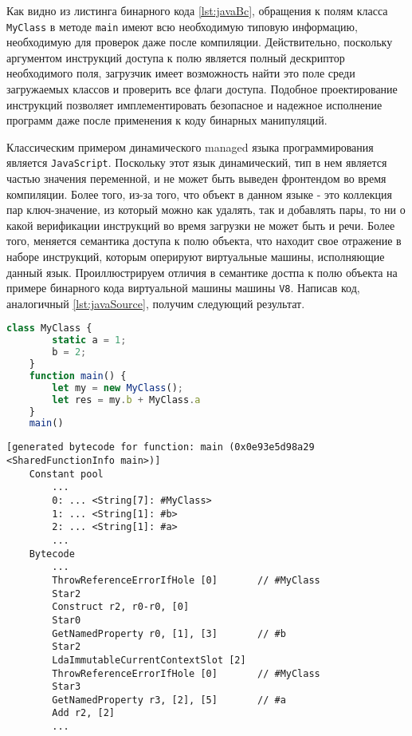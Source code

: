Как видно из листинга бинарного кода \autoref{lst:javaBc}, обращения к полям класса \texttt{MyClass} в методе \texttt{main} имеют всю необходимую типовую информацию, необходимую для проверок даже после компиляции. Действительно, поскольку аргументом инструкций доступа к полю является полный дескриптор необходимого поля, загрузчик имеет возможность найти это поле среди загружаемых классов и проверить все флаги доступа. Подобное проектирование инструкций позволяет имплементировать безопасное и надежное исполнение программ даже после применения к коду бинарных манипуляций.

Классическим примером динамического managed языка программирования является \texttt{JavaScript}. Поскольку этот язык динамический, тип в нем является частью значения переменной, и не может быть выведен фронтендом во время компиляции. Более того, из-за того, что объект в данном языке - это коллекция пар ключ-значение, из который можно как удалять, так и добавлять пары, то ни о какой верификации инструкций во время загрузки не может быть и речи. Более того, меняется семантика доступа к полю объекта, что находит свое отражение в наборе инструкций, которым оперируют виртуальные машины, исполняющие данный язык. Проиллюстрируем отличия в семантике достпа к полю объекта на примере бинарного кода виртуальной машины машины \texttt{V8}. Написав код, аналогичный \autoref{lst:javaSource}, получим следующий результат.

\begin{lstlisting}[language=Javascript, caption=Исходный код языка \texttt{JavaScript}., label=lst:jsSource]
    class MyClass {
        static a = 1;
        b = 2;
    }
    function main() {
        let my = new MyClass();
        let res = my.b + MyClass.a
    }
    main()
\end{lstlisting}

\begin{lstlisting}[caption=Бинарный код виртуальной машины \texttt{V8}., label=lst:jsBc]
    [generated bytecode for function: main (0x0e93e5d98a29 <SharedFunctionInfo main>)]
    Constant pool
        ...
        0: ... <String[7]: #MyClass>
        1: ... <String[1]: #b>
        2: ... <String[1]: #a>
        ...
    Bytecode
        ...
        ThrowReferenceErrorIfHole [0]       // #MyClass
        Star2
        Construct r2, r0-r0, [0]
        Star0
        GetNamedProperty r0, [1], [3]       // #b
        Star2
        LdaImmutableCurrentContextSlot [2]
        ThrowReferenceErrorIfHole [0]       // #MyClass
        Star3
        GetNamedProperty r3, [2], [5]       // #a
        Add r2, [2]
        ...
\end{lstlisting}

